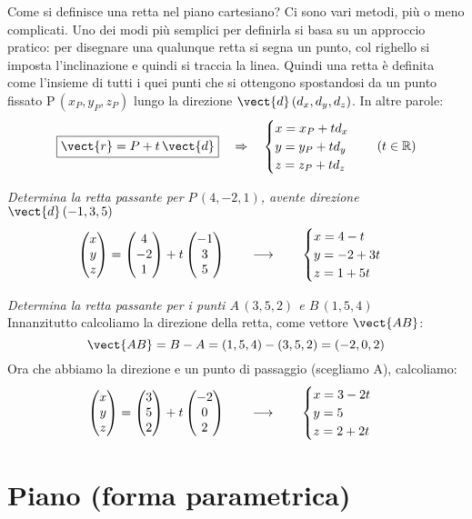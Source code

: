 Come si definisce una retta nel piano cartesiano? Ci sono vari metodi, più o meno complicati. Uno dei modi più semplici per definirla si basa su un approccio pratico: per disegnare una qualunque retta si segna un punto, col righello si imposta l'inclinazione e quindi si traccia la linea. Quindi una retta è definita come l'insieme di tutti i quei punti che si ottengono spostandosi da un punto fissato P\,$(x_P,y_P,z_P)$ lungo la direzione $\vect{d}\,(d_x,d_y,d_z)$. In altre parole:
\[\boxed{\vect{r} = P+t \, \vect{d}} \quad \Rightarrow \quad \begin{cases}
x = x_P+t d_x \\
y = y_P+t d_y \\
z = z_P+t d_z
\end{cases}  \quad (t \in \mathbb{R})\]
\begin{esempio}
\label{rettaPuntoDirez}
\emph{Determina la retta passante per $P\,(4,-2,1)$, avente direzione $\vect{d} \,(-1,3,5)$}
\[\begin{pmatrix} x\\ y\\ z \end{pmatrix} = \begin{pmatrix} 4\\ -2\\ 1 \end{pmatrix}+t \begin{pmatrix} -1\\ 3\\ 5 \end{pmatrix} \qquad \longrightarrow \qquad\begin{cases}
x = 4-t \\
y = -2+3t \\
z = 1+5t
\end{cases}\]
\end{esempio}
\begin{esempio}
 \emph{Determina la retta passante per i punti $A\,(3,5,2)$ e $B\,(1,5,4)$}\\[5pt]
 Innanzitutto calcoliamo la direzione della retta, come vettore $\vect{AB}$:
\[\vect{AB} = B-A = (1,5,4)-(3,5,2) = (-2,0,2)\]
Ora che abbiamo la direzione e un punto di passaggio (scegliamo A), calcoliamo:
\[\begin{pmatrix} x\\ y\\ z \end{pmatrix} = \begin{pmatrix} 3\\ 5\\ 2 \end{pmatrix}+t \begin{pmatrix} -2\\ 0\\ 2 \end{pmatrix} \qquad \longrightarrow \qquad\begin{cases}
x = 3-2t \\
y = 5 \\
z = 2+2t
\end{cases}\]
\end{esempio}

\section{Piano (forma parametrica)}

